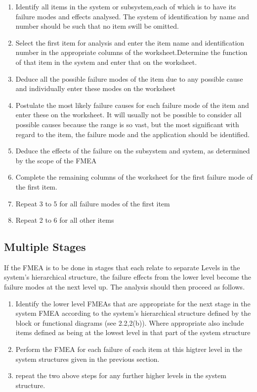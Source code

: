 \documentclass[./dissertation.tex]{subfiles}
\begin{document}
\begin{enumerate}

	\item Identify all items in the system or subsystem,each of which is to have its failure modes and effects analysed. The system of identification by name and number should be such that no item swill be omitted.
	\item Select the first item for analysis and enter the item name and identification number in the appropriate columns of the worksheet.Determine the function of that item in the system and enter that on the worksheet.
	\item Deduce all the possible failure modes of the item due to any possible cause and individually enter these modes on the worksheet
	\item  Postulate the most likely failure causes for each failure mode of the item and enter these on the worksheet. It will usually not be possible to consider all possible causes because the range is so vast, but the most significant with regard to the item, the failure mode and the application should be identified.
	\item Deduce the effects of the failure on the subsystem and system, as determined by the scope of the FMEA
	\item  Complete the remaining columns of the worksheet for the first failure mode of the first item.
	\item Repeat 3 to 5 for all failure modes of the first item
	\item Repeat 2 to 6 for all other items
\end{enumerate}


\subsection{Multiple Stages}
If the FMEA is to be done in stages that each relate to separate Levels in the system's hierarchical structure, the failure effects from the lower level become the failure modes at the next level up. The analysis should then proceed as follows.

\begin{enumerate}
	\item Identify the lower level FMEAs that are appropriate for the next stage in the system FMEA according to the system's hierarchical structure defined by the block or functional diagrams (see 2.2,2(b)). Where appropriate also include items defined as being at the lowest level in that part of the system structure
	\item Perform the FMEA for each failure of each item at this higtrer level in the system structures given in the previous section.
	\item repeat the two above steps for any further higher levels in the system structure.
\end{enumerate}
\end{document}
